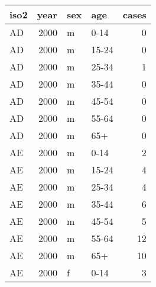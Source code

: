 \begin{tabular}{lrllr}
  \toprule
 iso2 & year & sex & age & cases \\ 
  \midrule
  AD & 2000 & m & 0-14 &   0 \\ 
  AD & 2000 & m & 15-24 &   0 \\ 
  AD & 2000 & m & 25-34 &   1 \\ 
  AD & 2000 & m & 35-44 &   0 \\ 
  AD & 2000 & m & 45-54 &   0 \\ 
  AD & 2000 & m & 55-64 &   0 \\ 
  AD & 2000 & m & 65+ &   0 \\ 
  AE & 2000 & m & 0-14 &   2 \\ 
  AE & 2000 & m & 15-24 &   4 \\ 
  AE & 2000 & m & 25-34 &   4 \\ 
  AE & 2000 & m & 35-44 &   6 \\ 
  AE & 2000 & m & 45-54 &   5 \\ 
  AE & 2000 & m & 55-64 &  12 \\ 
  AE & 2000 & m & 65+ &  10 \\ 
  AE & 2000 & f & 0-14 &   3 \\ 
   \bottomrule
\end{tabular}
